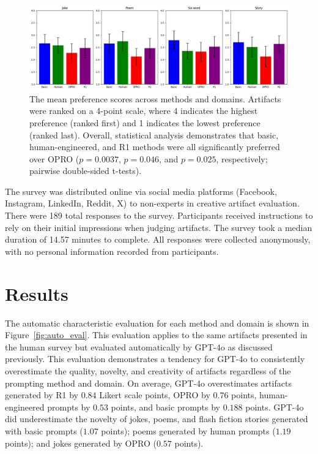 \documentclass[phd,electronic,oneside,twosidetoc,letterpaper,chaptercenter,parttop,lof]{byumsphd}
\begin{document}
\begin{figure}[t!]
    \centering
    \includegraphics[width=\textwidth]{images/cc_prompting/domain_pref_scores.png}
    \caption[Preference scores]{The mean preference scores across methods and domains. Artifacts were ranked on a 4-point scale, where 4 indicates the highest preference (ranked first) and 1 indicates the lowest preference (ranked last). Overall, statistical analysis demonstrates that basic, human-engineered, and R1 methods were all significantly preferred over OPRO ($p = 0.0037$, $p = 0.046$, and $p = 0.025$, respectively; pairwise double-sided t-tests).
}
    \label{fig:preferences}
\end{figure}

The survey was distributed online via social media platforms (Facebook, Instagram, LinkedIn, Reddit, X) to non-experts in creative artifact evaluation. There were 189 total responses to the survey. Participants received instructions to rely on their initial impressions when judging artifacts. The survey took a median duration of 14.57 minutes to complete. All responses were collected anonymously, with no personal information recorded from participants.

\section{Results}

The automatic characteristic evaluation for each method and domain is shown in Figure~\ref{fig:auto_eval}. This evaluation applies to the same artifacts presented in the human survey but evaluated automatically by GPT-4o as discussed previously. This evaluation demonstrates a tendency for GPT-4o to consistently overestimate the quality, novelty, and creativity of artifacts regardless of the prompting method and domain. On average, GPT-4o overestimates artifacts generated by R1 by $0.84$ Likert scale points, OPRO by $0.76$ points, human-engineered prompts by $0.53$ points, and basic prompts by $0.188$ points. GPT-4o did underestimate the novelty of jokes, poems, and flash fiction stories generated with basic prompts ($1.07$ points); poems generated by human prompts ($1.19$ points); and jokes generated by OPRO ($0.57$ points).
\end{document}
